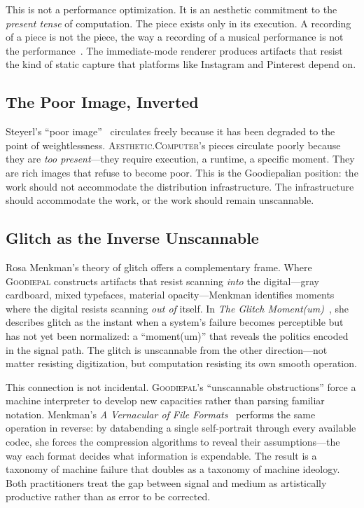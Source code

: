 \documentclass[10pt,letterpaper,twocolumn]{article}
\newcommand{\ac}{\textsc{Aesthetic.Computer}}
\newcommand{\gp}{\textsc{Goodiepal}}
\begin{document}
This is not a performance optimization. It is an aesthetic commitment to the \emph{present tense} of computation. The piece exists only in its execution. A recording of a piece is not the piece, the way a recording of a musical performance is not the performance~\citep{magnusson2010designing}. The immediate-mode renderer produces artifacts that resist the kind of static capture that platforms like Instagram and Pinterest depend on.

\subsection{The Poor Image, Inverted}

Steyerl's ``poor image''~\citep{steyerl2009defense} circulates freely because it has been degraded to the point of weightlessness. \ac{}'s pieces circulate poorly because they are \emph{too present}---they require execution, a runtime, a specific moment. They are rich images that refuse to become poor. This is the Goodiepalian position: the work should not accommodate the distribution infrastructure. The infrastructure should accommodate the work, or the work should remain unscannable.

\subsection{Glitch as the Inverse Unscannable}

Rosa Menkman's theory of glitch offers a complementary frame. Where \gp{} constructs artifacts that resist scanning \emph{into} the digital---gray cardboard, mixed typefaces, material opacity---Menkman identifies moments where the digital resists scanning \emph{out of} itself. In \emph{The Glitch Moment(um)}~\citep{menkman2011glitch}, she describes glitch as the instant when a system's failure becomes perceptible but has not yet been normalized: a ``moment(um)'' that reveals the politics encoded in the signal path. The glitch is unscannable from the other direction---not matter resisting digitization, but computation resisting its own smooth operation.

This connection is not incidental. \gp{}'s ``unscannable obstructions'' force a machine interpreter to develop new capacities rather than parsing familiar notation. Menkman's \emph{A Vernacular of File Formats}~\citep{menkman2010vernacular} performs the same operation in reverse: by databending a single self-portrait through every available codec, she forces the compression algorithms to reveal their assumptions---the way each format decides what information is expendable. The result is a taxonomy of machine failure that doubles as a taxonomy of machine ideology. Both practitioners treat the gap between signal and medium as artistically productive rather than as error to be corrected.
\end{document}

